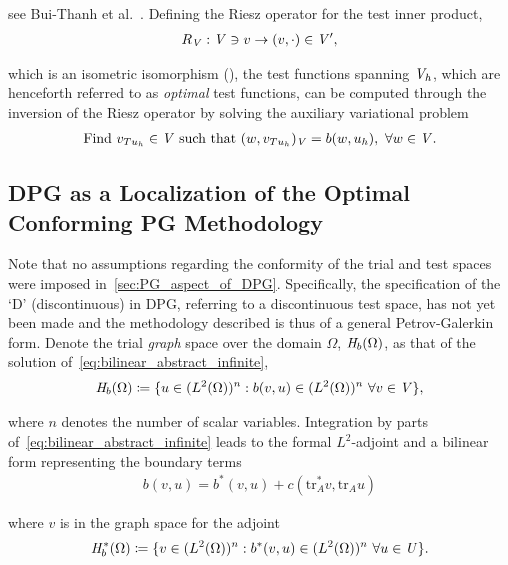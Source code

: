 see Bui-Thanh et al.~\cite[Theorem ]{BuiThanh2013}. Defining the Riesz operator for the test inner
product,
\begin{align}
R_{\mathit{{{V}}}} : \mathit{{{V}}} \ni v \rightarrow (v,\cdot) \in \mathit{{{V}}}',
\end{align}

which is an isometric isomorphism (\cite[Theorem ]{Ciarlet2013}), the test functions
spanning $\mathit{{{V}}}_h$, which are henceforth referred to as \emph{optimal} test
functions, can be computed through the inversion of the Riesz operator by solving the auxiliary variational problem
\begin{align} \label{eq:auxiliary_opt_v}
\text{Find}\ v_{T u_h} \in \mathit{{{V}}}\ \text{such that}\
(w,v_{T u_h})_{\mathit{{{V}}}} = b(w,u_h),\ \forall w \in \mathit{{{V}}}.
\end{align}

\subsection{DPG as a Localization of the Optimal Conforming PG Methodology} \label{sec:dpg_abstract_setting}

Note that no assumptions regarding the conformity of the trial and test spaces were imposed
in~\autoref{sec:PG_aspect_of_DPG}. Specifically, the specification of the `D' (discontinuous) in DPG, referring to a
discontinuous test space, has not yet been made and the methodology described is thus of a general Petrov-Galerkin
form. Denote the trial \emph{graph} space over the domain $\Omega$, $\mathit{{{H}}}_b(\Omega)$, as that of the solution
of~\eqref{eq:bilinear_abstract_infinite},
\begin{align}
\mathit{{{H}}}_b(\Omega) \coloneqq
\{ u \in (L^2(\Omega))^n : b(v,u) \in (L^2(\Omega))^n\ \forall v \in \mathit{{{V}}} \},
\end{align}

where $n$ denotes the number of scalar variables. Integration by parts of~\eqref{eq:bilinear_abstract_infinite} leads to
the formal $L^2$-adjoint and a bilinear form representing the boundary terms
\begin{align}
b(v,u) = b^*(v,u) + c(\text{tr}_A^* v, \text{tr}_A u)
\end{align}

where $v$ is in the graph space for the adjoint
\begin{align}
\mathit{{{H}}}_b^*(\Omega) \coloneqq
\{ v \in (L^2(\Omega))^n : b^*(v,u) \in (L^2(\Omega))^n\ \forall u \in \mathit{{{U}}} \}.
\end{align}

